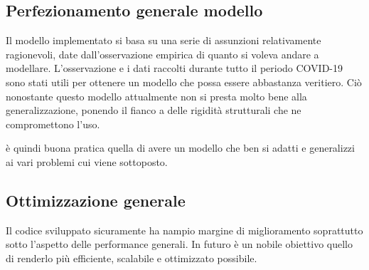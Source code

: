 \subsection{Perfezionamento generale modello}
Il modello implementato si basa su una serie di assunzioni relativamente ragionevoli, date dall'osservazione empirica
di quanto si voleva andare a modellare. L'osservazione e i dati raccolti durante tutto il periodo COVID-19 sono stati 
utili per ottenere un modello che possa essere abbastanza veritiero. Ciò nonostante questo modello attualmente non si presta
molto bene alla generalizzazione, ponendo il fianco a delle rigidità strutturali che ne compromettono l'uso. 

è quindi buona pratica quella di avere un modello che ben si adatti e generalizzi ai vari problemi cui viene sottoposto.

\subsection{Ottimizzazione generale}
Il codice sviluppato sicuramente ha nampio margine di miglioramento soprattutto sotto l'aspetto delle performance generali. 
In futuro è un nobile obiettivo quello di renderlo più efficiente, scalabile e ottimizzato possibile.

